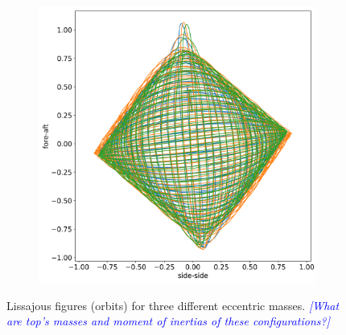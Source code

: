 \documentclass{article}
\newcommand{\andy}[1]{\textcolor{blue}{\emph{#1}}}
\begin{document}
\begin{figure}
\begin{subfigure}[b]{0.45\textwidth}
        \includegraphics[width=\textwidth]{results/experiment/medium_mass_orbit.png}
        \caption{}
        \label{fig:medium-mass:orbit}
    \end{subfigure}
    
    \caption{Lissajous figures (orbits) for three different eccentric masses. \andy{[What are top's masses and moment of inertias of these configurations?]}}
    \label{fig:medium-mass}
\end{figure}

\end{document}
